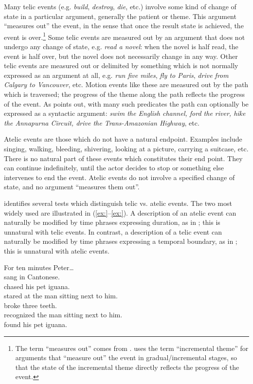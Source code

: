 Many telic events (e.g. \textit{build}, \textit{destroy}, \textit{die}, etc.) involve some kind of change of state in a particular argument, generally the patient or theme. This argument “measures out” the event, in the sense that once the result state is achieved, the event is over.\footnote{The term “measures out” comes from \citet{Tenny1987}. \citet{Dowty1991} uses the term “incremental theme” for arguments that “measure out” the event in gradual/incremental stages, so that the state of the incremental theme directly reflects the progress of the event.} Some telic events are measured out by an argument that does not undergo any change of state, e.g. \textit{read a novel}: when the novel is half read, the event is half over, but the novel does not necessarily change in any way. Other telic events are measured out or delimited by something which is not normally expressed as an argument at all, e.g. \textit{run five miles}, \textit{fly to Paris}, \textit{drive from Calgary to Vancouver}, etc. Motion events like these are measured out by the path which is traversed; the progress of the theme along the path reflects the progress of the event. As \citet{Dowty1991} points out, with many such predicates the path can optionally be expressed as a syntactic argument: \textit{swim the English channel, ford the river, hike the Annapurna Circuit, drive the Trans-Amazonian Highway}, etc.



Atelic events are those which do not have a natural endpoint. Examples include singing, walking, bleeding, shivering, looking at a picture, carrying a suitcase, etc. There is no natural part of these events which constitutes their end point. They can continue indefinitely, until the actor decides to stop or something else intervenes to end the event. Atelic events do not involve a specified change of state, and no argument “measures them out”.



\citet{Dowty1979} identifies several tests which distinguish telic vs. atelic events. The two most widely used are illustrated in (\ref{ex:}--\ref{ex:}). A description of an atelic event can naturally be modified by time phrases expressing duration, as in ; this is unnatural with telic events. In contrast, a description of a telic event can naturally be modified by time phrases expressing a temporal boundary, as in ; this is unnatural with atelic events.


\ea
For ten minutes Peter…\\
\ea sang in Cantonese.\\
\ex chased his pet iguana.\\
\ex stared at the man sitting next to him.\\
\ex *broke three teeth.\\
\ex *recognized the man sitting next to him.\\
\ex *found his pet iguana.
                       \z
\z

